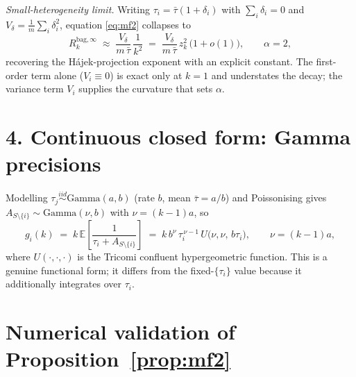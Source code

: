 \documentclass[11pt]{article}
\newcommand{\E}{\mathbb{E}}
\newcommand{\Rk}{R_k^{\mathrm{bag},\infty}}
\begin{document}
\noindent\emph{Small-heterogeneity limit.} Writing $\tau_i=\bar\tau(1+\delta_i)$ with
$\sum_i\delta_i=0$ and $V_\delta=\tfrac1m\sum_i\delta_i^2$, equation \eqref{eq:mf2} collapses to
\begin{equation}\label{eq:smallhet}
  \Rk\;\approx\;\frac{V_\delta}{m\,\bar\tau}\,\frac{1}{k^2}
  \;=\;\frac{V_\delta}{m\,\bar\tau}\,z_k^2\,\bigl(1+o(1)\bigr),
  \qquad \alpha=2,
\end{equation}
recovering the H\'ajek-projection exponent with an explicit constant.
The first-order term alone ($V_i\equiv0$) is exact only at $k=1$ and understates the
decay; the variance term $V_i$ supplies the curvature that sets $\alpha$.

\section*{4. Continuous closed form: Gamma precisions}

Modelling $\tau_j\stackrel{iid}{\sim}\mathrm{Gamma}(a,b)$ (rate $b$, mean $\bar\tau=a/b$)
and Poissonising gives $A_{S\setminus\{i\}}\sim\mathrm{Gamma}(\nu,b)$ with $\nu=(k-1)a$, so
\begin{equation}\label{eq:gamma}
  g_i(k)\;=\;k\,\E\!\left[\frac{1}{\tau_i+A_{S\setminus\{i\}}}\right]
  \;=\;k\,b^{\nu}\,\tau_i^{\,\nu-1}\,U\!\big(\nu,\nu,\,b\tau_i\big),
  \qquad \nu=(k-1)a,
\end{equation}
where $U(\cdot,\cdot,\cdot)$ is the Tricomi confluent hypergeometric function. This is a
genuine functional form; it differs from the fixed-$\{\tau_i\}$ value because it
additionally integrates over $\tau_i$.

\section*{Numerical validation of Proposition~\ref{prop:mf2}}
\end{document}

